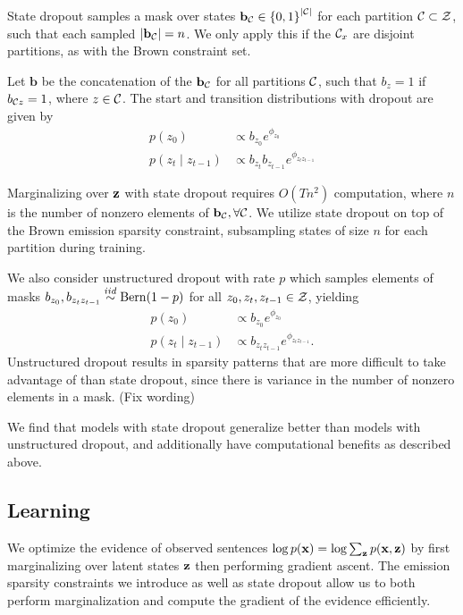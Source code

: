 \documentclass[11pt,a4paper]{article}
\begin{document}
State dropout samples a mask over states
$\mathbf{b}_{\mathcal{C}} \in \left\{0,1\right\}^{|\mathcal{C}|}$ for each partition $\mathcal{C} \subset \mathcal{Z}$,
such that each sampled $|\mathbf{b}_{\mathcal{C}}| = n$.
We only apply this if the $\mathcal{C}_x$ are disjoint partitions,
as with the Brown constraint set.

Let $\mathbf{b}$ be the concatenation of the $\mathbf{b}_{\mathcal{C}}$ for all partitions $\mathcal{C}$,
such that $b_z = 1$ if $b_{\mathcal{C} z} = 1$, where $z \in \mathcal{C}$.
The start and transition distributions with dropout are given by
\begin{equation}
\label{eqn:state_dropout}
\begin{aligned}
p(z_0) &\propto b_{z_0}e^{\phi_{z_0}}\\
p(z_t \mid z_{t-1}) &\propto b_{z_t}b_{z_{t-1}}e^{\phi_{z_tz_{t-1}}}
\end{aligned}
\end{equation}

Marginalizing over $\mathbf{z}$ with state dropout requires $O(Tn^2)$ computation,
where $n$ is the number of nonzero elements of $\mathbf{b}_{\mathcal{C}}, \forall \mathcal{C}$.
We utilize state dropout on top of the Brown emission sparsity constraint,
subsampling states of size $n$ for each partition during training.

We also consider unstructured dropout with rate $p$
which samples elements of masks $b_{z_0}, b_{z_tz_{t-1}}\overset{iid}{\sim} \mathrm{Bern}(1-p)$
for all $z_0, z_t, z_{t-1}\in\mathcal{Z}$, yielding
\begin{equation}
\label{eqn:unstructured_dropout}
\begin{aligned}
p(z_0) &\propto b_{z_0}e^{\phi_{z_0}}\\
p(z_t \mid z_{t-1}) &\propto b_{z_tz_{t-1}}e^{\phi_{z_tz_{t-1}}}.
\end{aligned}
\end{equation}
Unstructured dropout results in sparsity patterns that are
more difficult to take advantage of than state dropout,
since there is variance in the number of nonzero elements
in a mask.
(Fix wording)

We find that models with state dropout
generalize better than models with unstructured dropout,
and additionally have computational benefits as described above.


\subsection{Learning}
We optimize the evidence of observed sentences $\log p(\mathbf{x}) = \log \sum_{\mathbf{z}} p(\mathbf{x},\mathbf{z})$
by first marginalizing over latent states $\mathbf{z}$ then performing gradient ascent.
The emission sparsity constraints we introduce as well as state dropout
allow us to both perform marginalization
and compute the gradient of the evidence efficiently.
\end{document}
